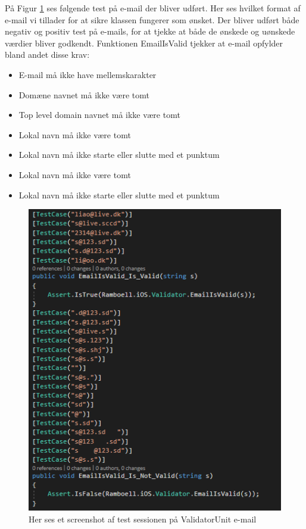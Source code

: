 På Figur \ref{fig:ValidatorUnitEmail} ses følgende test på e-mail der bliver udført. Her ses hvilket format af e-mail vi tillader for at sikre klassen fungerer som ønsket.
Der bliver udført både negativ og positiv test på e-mails, for at tjekke at både de ønskede og uønskede værdier bliver godkendt. Funktionen EmailIsValid tjekker at e-mail opfylder bland andet disse krav:\\
\begin{itemize}
	\item E-mail må ikke have mellemskarakter
	\item Domæne navnet må ikke være tomt
	\item Top level domain navnet\cite{TLD} må ikke være tomt
	\item Lokal navn må ikke være tomt
	\item Lokal navn må ikke starte eller slutte med et punktum
	\item Lokal navn må ikke være tomt
	\item Lokal navn må ikke starte eller slutte med et punktum
	
\end{itemize}

\begin{figure}[H]
	\centering
	\includegraphics[width=0.6\linewidth]{Unit/ValidatorUnitEmail.PNG}
	\caption{Her ses et screenshot af test sessionen på ValidatorUnit e-mail}
	\label{fig:ValidatorUnitEmail}
\end{figure}

\clearpage

